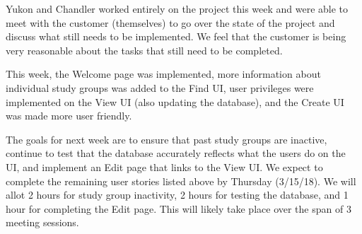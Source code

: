 \documentclass[12pt,letterpaper]{article}
\begin{document}
Yukon and Chandler worked entirely on the project this week and were able to meet with the customer (themselves) to go over the state of the project and discuss what still needs to be implemented. We feel that the customer is being very reasonable about the tasks that still need to be completed.

This week, the Welcome page was implemented, more information about individual study groups was added to the Find UI, user privileges were implemented on the View UI (also updating the database), and the Create UI was made more user friendly. 

The goals for next week are to ensure that past study groups are inactive, continue to test that the database accurately reflects what the users do on the UI, and implement an Edit page that links to the View UI. We expect to complete the remaining user stories listed above by Thursday (3/15/18). We will allot 2 hours for study group inactivity, 2 hours for testing the database, and 1 hour for completing the Edit page. This will likely take place over the span of 3 meeting sessions. 
\end{document}
